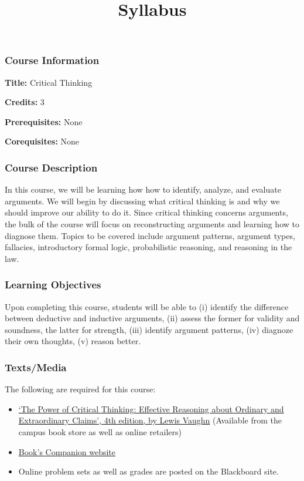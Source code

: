 \documentclass[]{article}
\title{Syllabus}
\date{}
\begin{document}
\maketitle

\subsubsection{Course Information}\label{course-information}

\textbf{Title:} Critical Thinking

\textbf{Credits:} 3

\textbf{Prerequisites:} None

\textbf{Corequisites:} None

\subsubsection{Course Description}\label{course-description}

In this course, we will be learning how how to identify, analyze, and
evaluate arguments. We will begin by discussing what critical thinking
is and why we should improve our ability to do it. Since critical
thinking concerns arguments, the bulk of the course will focus on
reconstructing arguments and learning how to diagnose them. Topics to be
covered include argument patterns, argument types, fallacies,
introductory formal logic, probabilistic reasoning, and reasoning in the
law.

\subsubsection{Learning Objectives}\label{learning-objectives}

Upon completing this course, students will be able to (i) identify the
difference between deductive and inductive arguments, (ii) assess the
former for validity and soundness, the latter for strength, (iii)
identify argument patterns, (iv) diagnoze their own thoughts, (v) reason
better.

\subsubsection{Texts/Media}\label{textsmedia}

The following are required for this course:

\begin{itemize}
\itemsep1pt\parskip0pt
\item
  \href{http://www.amazon.com/Power-Critical-Thinking-Effective-Extraordinary/dp/0199856672/ref=sr_1_1?s=books\&ie=UTF8\&qid=1421936130\&sr=1-1\&keywords=critical+thinking+vaughn}{`The
  Power of Critical Thinking: Effective Reasoning about Ordinary and
  Extraordinary Claims', 4th edition, by Lewis Vaughn} (Available from
  the campus book store as well as online retailers)
\item
  \href{http://global.oup.com/us/companion.websites/9780199856671/student/}{Book's
  Companion website}
\item
  Online problem sets as well as grades are posted on the Blackboard
  site.
\end{itemize}
\end{document}
